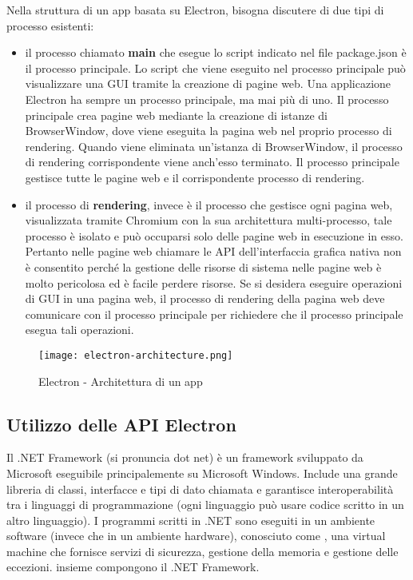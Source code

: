 Nella struttura di un app basata su Electron, bisogna discutere di due tipi di processo esistenti:
\begin{itemize}
	\item  il processo chiamato \textbf{main} che esegue lo script indicato nel file package.json è il processo principale. Lo script che viene eseguito nel processo principale può visualizzare una \Gls{GUI} tramite la creazione di pagine web. Una applicazione Electron ha sempre un 		processo principale, ma mai più di uno. Il processo principale crea pagine web mediante la creazione di istanze di BrowserWindow, dove viene eseguita la pagina web nel proprio processo di rendering. Quando viene eliminata un'istanza di BrowserWindow, il processo di 		rendering corrispondente viene anch'esso terminato. Il processo principale gestisce tutte le pagine web e il corrispondente processo di rendering.
	\item il processo di \textbf{rendering}, invece è il processo che gestisce ogni pagina web, visualizzata tramite Chromium con la sua architettura multi-processo, tale processo è isolato e può occuparsi solo delle pagine web in esecuzione in esso.
	Pertanto nelle pagine web chiamare le API dell'interfaccia grafica nativa non è consentito perché la gestione delle risorse di sistema nelle pagine web è molto pericolosa ed è facile perdere risorse. Se si desidera eseguire operazioni di \Gls{GUI} in una pagina web, il processo di 		rendering della pagina web deve comunicare con il processo principale per richiedere che il processo principale esegua tali operazioni.
\end{itemize}

\begin{figure}[H]
    \centering
    \texttt{[image: electron-architecture.png]}
    \caption{Electron - Architettura di un app}
    \label{fig:ElectronArch}
\end{figure}


\subsection{Utilizzo delle API Electron}

Il .NET Framework (si pronuncia dot net) è un framework sviluppato da Microsoft eseguibile principalemente su Microsoft Windows.
Include una grande libreria di classi, interfacce e tipi di dato chiamata e garantisce interoperabilità tra i linguaggi di programmazione (ogni linguaggio può usare codice scritto in un altro linguaggio).
I programmi scritti in .NET sono eseguiti in un ambiente software (invece che in un ambiente hardware), conosciuto come , una virtual machine che fornisce servizi di sicurezza, gestione della memoria e gestione delle eccezioni.
 insieme compongono il .NET Framework.

